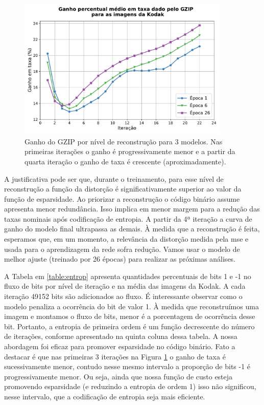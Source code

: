 \begin{figure}
	\centering
	\includegraphics[width=0.9\textwidth]{figuras/ganho_taxa_3epocas.pdf}
	\caption[Ganho do GZIP por nível de reconstrução]{Ganho do GZIP por nível de reconstrução para 3 modelos. Nas primeiras iterações o ganho é progressivamente menor e a partir da quarta iteração o ganho de taxa é crescente (aproximadamente).}  	
	\label{fig:gain_medio_bpp}
\end{figure}


A justificativa pode ser que, durante o treinamento, para esse nível de reconstrução a função da distorção é significativamente superior ao valor da função de esparsidade. Ao priorizar a reconstrução o código binário assume apresenta menor redundância. Isso implica em menor margem para a redução das taxas nominais após codificação de entropia. 
A partir da 4ª iteração a curva de ganho do modelo final ultrapassa as demais. À medida que a reconstrução é feita, esperamos que, em um momento, a relevância da distorção medida pela \acrshort{mse} e usada para o aprendizagem da rede sofra redução. Vamos usar o modelo de melhor ajuste (treinado por 26 épocas) para realizar as próximas análises.  



A Tabela em \ref{table:entrop} apresenta quantidades percentuais de bits 1 e -1 no fluxo de bits por nível de iteração e na média das imagens da Kodak. A cada iteração 49152 bits são adicionados ao fluxo. 
É interessante observar como o modelo penaliza a ocorrência do bit de valor 1. À medida que reconstruímos uma imagem e montamos o fluxo de bits, menor é a porcentagem de ocorrência desse bit.  Portanto, a entropia de primeira ordem é um função decrescente do número de iterações, conforme apresentado na quinta coluna dessa tabela.  A nossa  abordagem foi eficaz para promover esparsidade no código binário. 
Fato a destacar é que nas primeiras 3 iterações na Figura \ref{fig:gain_medio_bpp} o ganho de taxa é sucessivamente menor, contudo nesse mesmo intervalo a proporção de bits -1 é progressivamente menor.  Ou seja, ainda que nossa função de custo esteja promovendo esparsidade (e reduzindo a entropia de ordem 1) isso não significou, nesse intervalo, que a codificação de entropia seja mais eficiente.  

